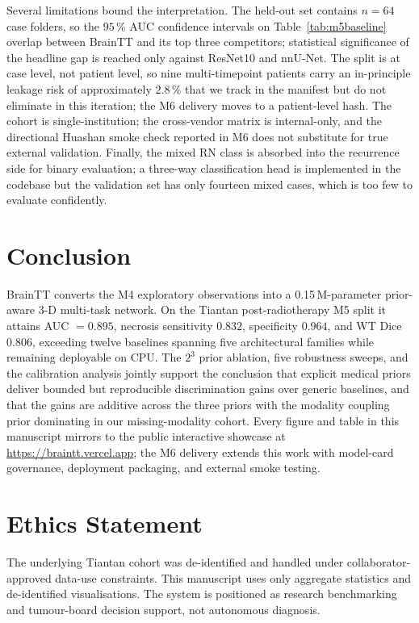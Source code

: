 \documentclass[11pt,a4paper]{article}
\begin{document}
Several limitations bound the interpretation. The held-out set contains $n=64$ case folders, so the $95\,\%$ AUC confidence intervals on Table~\ref{tab:m5baseline} overlap between BrainTT and its top three competitors; statistical significance of the headline gap is reached only against ResNet10 and nnU-Net. The split is at case level, not patient level, so nine multi-timepoint patients carry an in-principle leakage risk of approximately $2.8\,\%$ that we track in the manifest but do not eliminate in this iteration; the M6 delivery moves to a patient-level hash. The cohort is single-institution; the cross-vendor matrix is internal-only, and the directional Huashan smoke check reported in M6 does not substitute for true external validation. Finally, the mixed RN class is absorbed into the recurrence side for binary evaluation; a three-way classification head is implemented in the codebase but the validation set has only fourteen mixed cases, which is too few to evaluate confidently.

\section{Conclusion}

BrainTT converts the M4 exploratory observations into a 0.15\,M-parameter prior-aware 3-D multi-task network. On the Tiantan post-radiotherapy M5 split it attains AUC $=0.895$, necrosis sensitivity $0.832$, specificity $0.964$, and WT Dice $0.806$, exceeding twelve baselines spanning five architectural families while remaining deployable on CPU. The $2^3$ prior ablation, five robustness sweeps, and the calibration analysis jointly support the conclusion that explicit medical priors deliver bounded but reproducible discrimination gains over generic baselines, and that the gains are additive across the three priors with the modality coupling prior dominating in our missing-modality cohort. Every figure and table in this manuscript mirrors to the public interactive showcase at \url{https://braintt.vercel.app}; the M6 delivery extends this work with model-card governance, deployment packaging, and external smoke testing.

\section*{Ethics Statement}

The underlying Tiantan cohort was de-identified and handled under collaborator-approved data-use constraints. This manuscript uses only aggregate statistics and de-identified visualisations. The system is positioned as research benchmarking and tumour-board decision support, not autonomous diagnosis.
\end{document}
